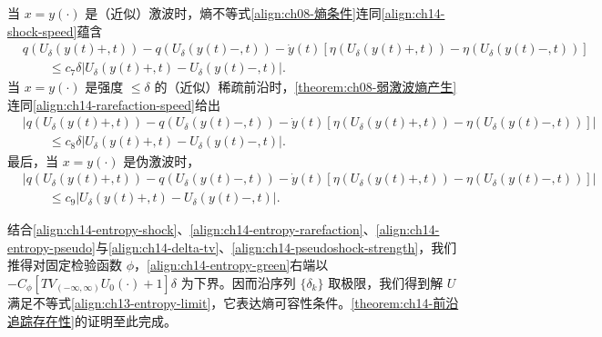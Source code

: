 \documentclass[../../main.tex]{subfiles}
\begin{document}
当 $x=y(\cdot)$ 是（近似）激波时，熵不等式\eqref{align:ch08-熵条件}连同\eqref{align:ch14-shock-speed}蕴含
\begin{align}
&q(U_\delta(y(t)+,t))-q(U_\delta(y(t)-,t))-\dot y(t)[\eta(U_\delta(y(t)+,t))-\eta(U_\delta(y(t)-,t))]\nonumber\\
&\qquad\leqslant c_7\delta|U_\delta(y(t)+,t)-U_\delta(y(t)-,t)|.
\label{align:ch14-entropy-shock}
\end{align}
当 $x=y(\cdot)$ 是强度 $\leqslant\delta$ 的（近似）稀疏前沿时，\cref{theorem:ch08-弱激波熵产生}连同\eqref{align:ch14-rarefaction-speed}给出
\begin{align}
&|q(U_\delta(y(t)+,t))-q(U_\delta(y(t)-,t))-\dot y(t)[\eta(U_\delta(y(t)+,t))-\eta(U_\delta(y(t)-,t))]|\nonumber\\
&\qquad\leqslant c_8\delta|U_\delta(y(t)+,t)-U_\delta(y(t)-,t)|.
\label{align:ch14-entropy-rarefaction}
\end{align}
最后，当 $x=y(\cdot)$ 是伪激波时，
\begin{align}
&|q(U_\delta(y(t)+,t))-q(U_\delta(y(t)-,t))-\dot y(t)[\eta(U_\delta(y(t)+,t))-\eta(U_\delta(y(t)-,t))]|\nonumber\\
&\qquad\leqslant c_9|U_\delta(y(t)+,t)-U_\delta(y(t)-,t)|.
\label{align:ch14-entropy-pseudo}
\end{align}

结合\eqref{align:ch14-entropy-shock}、\eqref{align:ch14-entropy-rarefaction}、\eqref{align:ch14-entropy-pseudo}与\eqref{align:ch14-delta-tv}、\eqref{align:ch14-pseudoshock-strength}，我们推得对固定检验函数 $\phi$，\eqref{align:ch14-entropy-green}右端以 $-C_\phi[TV_{(-\infty,\infty)}U_0(\cdot)+1]\delta$ 为下界。因而沿序列 $\{\delta_k\}$ 取极限，我们得到解 $U$ 满足不等式\eqref{align:ch13-entropy-limit}，它表达熵可容性条件。\cref{theorem:ch14-前沿追踪存在性}的证明至此完成。
\end{document}
